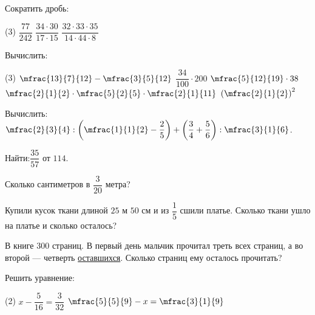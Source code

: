 \begin{class}[number=4]
	\begin{listofex}
		\item Сократить дробь:
		\begin{tasks}(3)
			\task \( \dfrac{77}{242} \)
			\task \( \dfrac{34\cdot30}{17\cdot15} \)
			\task \( \dfrac{32\cdot33\cdot35}{14\cdot44\cdot8} \)
		\end{tasks}
		\item Вычислить:
		\begin{tasks}(3)
			\task \( \mfrac{13}{7}{12}-\mfrac{3}{5}{12} \)
			\task \( \dfrac{34}{100}\cdot200 \)
			\task \( \mfrac{5}{12}{19}\cdot38 \)
			\task \( \mfrac{2}{1}{2}\cdot\mfrac{5}{2}{5}\cdot\mfrac{2}{1}{11}\)
			\task \( \left( \mfrac{2}{1}{2} \right)^2 \)
		\end{tasks}
		\item Вычислить:\quad\( \mfrac{2}{3}{4}:\left( \mfrac{1}{1}{2}-\dfrac{2}{5} \right)+\left( \dfrac{3}{4}+\dfrac{5}{6} \right):\mfrac{3}{1}{6} \).
		\item Найти:\quad\( \dfrac{35}{57} \) от \( 114 \).
		\item Сколько сантиметров в \( \dfrac{3}{20} \) метра?
		\item Купили кусок ткани длиной \( 25 \) м \( 50 \) см и из \( \dfrac{1}{5} \) сшили платье. Сколько ткани ушло на платье и сколько осталось?
		\item В книге \( 300 \) страниц. В первый день мальчик прочитал треть всех страниц, а во второй --- четверть \underline{оставшихся}. Сколько страниц ему осталось прочитать?
		\item Решить уравнение:
		\begin{tasks}(2)
			\task \( x-\dfrac{5}{16}=\dfrac{3}{32} \)
			\task \( \mfrac{5}{5}{9}-x=\mfrac{3}{1}{9} \)
		\end{tasks}
	\end{listofex}
\end{class}
%
%
